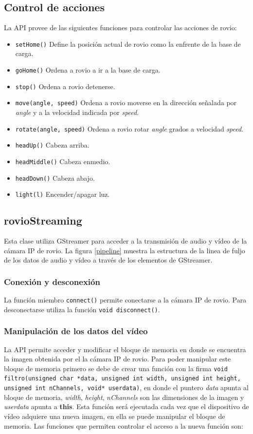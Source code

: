 \documentclass[a4paper,10pt]{article}
\begin{document}
\subsection{Control de acciones}
La API provee de las siguientes funciones para controlar las acciones de rovio:
\begin{itemize}
  \item \texttt{setHome()} Define la posición actual de rovio como la enfrente de la base de carga. 
  \item \texttt{goHome()} Ordena a rovio a ir a la base de carga.
  \item \texttt{stop()} Ordena a rovio detenerse.
  \item \texttt{move(angle, speed)} Ordena a rovio moverse en la dirección señalada por \textit{angle} y a la velocidad indicada por \textit{speed}.
  \item \texttt{rotate(angle, speed)} Ordena a rovio rotar \textit{angle} grados a velocidad \textit{speed}.
  \item \texttt{headUp()} Cabeza arriba.
  \item \texttt{headMiddle()} Cabeza enmedio.
  \item \texttt{headDown()} Cabeza abajo.
  \item \texttt{light(l)} Encender/apagar luz.
\end{itemize}

\subsection{rovioStreaming}
Esta clase utiliza GStreamer para acceder a la transmisión de audio y vídeo de la cámara IP de rovio. La figura \ref{pipeline} muestra la estructura de la linea de fuljo de los datos de audio y vídeo a través de los elementos de GStreamer.

  \subsubsection{Conexión y desconexión}
    La función miembro \texttt{connect()} permite conectarse a la cámara IP de rovio.
    Para desconectarse utiliza la función \texttt{void disconnect()}.
  \subsubsection{Manipulación de los datos del vídeo}
  La API permite acceder y modificar el bloque de memoria en donde se encuentra la imagen obtenida por el la cámara IP de rovio. Para poder manipular este bloque de memoria primero se debe de crear una función con la firma \texttt{void filtro(unsigned char *data, unsigned int width, unsigned int height, unsigned int nChannels, void* userdata)}, en donde el puntero \textit{data} apunta al bloque de memoria, \textit{width}, \textit{height}, \textit{nChannels} son las dimensiones de la imagen y \textit{userdata} apunta a \textbf{this}. Esta función será ejecutada cada vez que el dispositivo de vídeo adquiere una nueva imagen, en ella se puede manipular el bloque de memoria. Las funciones que permiten controlar el acceso a la nueva función son:
 
\end{document}
